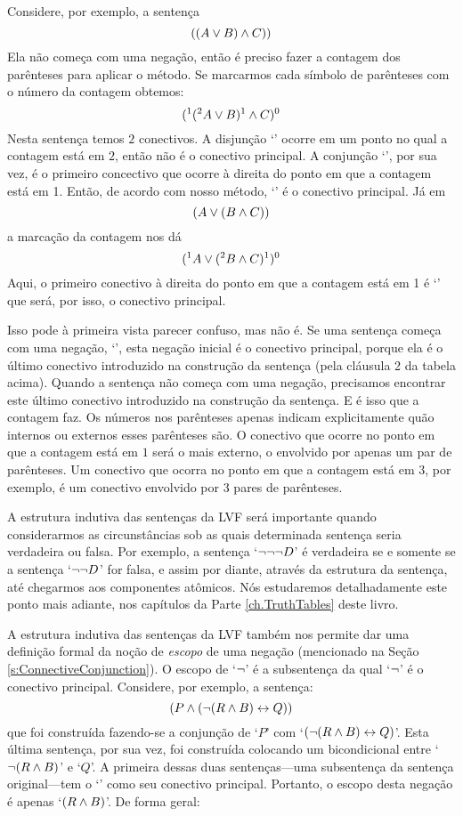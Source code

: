 Considere, por exemplo, a sentença
$$((A \vee B) \wedge C))$$
Ela não começa com uma negação, então é preciso fazer a contagem dos parênteses para aplicar o método.
Se marcarmos cada símbolo de parênteses com o número da contagem obtemos:
$$(^1 (^2 A \vee B)^1 \wedge C)^0$$
Nesta sentença temos $2$ conectivos.
A disjunção `\eor' ocorre em um ponto no qual a contagem está em $2$, então não é o conectivo principal.
A conjunção `\eand', por sua vez, é o primeiro concectivo que ocorre à direita do ponto em que a contagem está em 1.
Então, de acordo com nosso método, `\eand' é o conectivo principal.
Já em
$$(A \vee (B \wedge C))$$
a marcação da contagem nos dá
$$(^1 A \vee (^2 B \wedge C)^1 )^0$$
Aqui, o primeiro conectivo à direita do ponto em que a contagem está em 1 é `\eor' que será, por isso, o conectivo principal.

Isso pode à primeira vista parecer confuso, mas não é.
Se uma sentença começa com uma negação, `\enot', esta negação inicial é o conectivo principal, porque ela é o último conectivo introduzido na construção da sentença (pela cláusula 2 da tabela acima).
Quando a sentença não começa com uma negação, precisamos encontrar este último conectivo introduzido na construção da sentença.
E é isso que a contagem faz.
Os números nos parênteses apenas indicam explicitamente quão internos ou externos esses parênteses são.
O conectivo que ocorre no ponto em que a contagem está em $1$ será o mais externo, o envolvido por apenas um par de parênteses.
Um conectivo que ocorra no ponto em que a contagem está em $3$, por exemplo, é um conectivo envolvido por 3 pares de parênteses.
 
A estrutura indutiva das sentenças da LVF será importante quando considerarmos as circunstâncias sob as quais determinada sentença seria verdadeira ou falsa.
Por exemplo, a sentença `$\neg\neg\neg D$' é verdadeira se e somente se a sentença `$\neg\neg D$' for falsa, e assim por diante, através da estrutura da sentença, até chegarmos aos componentes atômicos.
Nós estudaremos detalhadamente este ponto mais adiante, nos capítulos da Parte \ref{ch.TruthTables} deste livro.

A estrutura indutiva das sentenças da LVF também nos permite dar uma definição formal da noção de \emph{escopo} de uma negação (mencionado na Seção  \ref{s:ConnectiveConjunction}).
O escopo de `$\neg$' é a subsentença da qual `$\neg$' é o conectivo principal.
Considere, por exemplo, a sentença:
$$(P \wedge (\neg (R \wedge B) \leftrightarrow Q))$$
que foi construída fazendo-se a conjunção de `$P$' com \mbox{`$(\neg(R \wedge B) \leftrightarrow Q)$'}.
Esta última sentença, por sua vez, foi construída colocando um bicondicional entre `$\neg(R \wedge B)$' e `$Q$'.
A primeira dessas duas sentenças---uma subsentença da sentença original---tem o `\enot' como seu conectivo principal.
Portanto, o escopo desta negação é apenas `$(R \wedge B)$'.
De forma geral:

